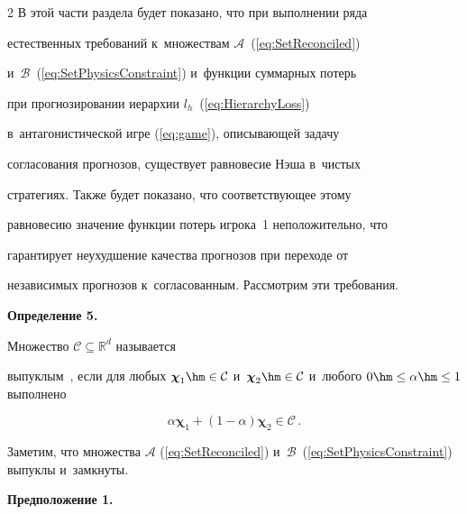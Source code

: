 \begin{multicols}{2}
В этой части раздела будет показано, что при выполнении ряда

естественных требований к~множествам $\mathcal{A}$~(\ref{eq:SetReconciled})

и~$\mathcal{B}$~(\ref{eq:SetPhysicsConstraint}) и~функции суммарных потерь

при прогнозировании иерархии $l_h$~(\ref{eq:HierarchyLoss})

в~антагонистической игре (\ref{eq:game}), описывающей задачу

согласования прогнозов, существует равновесие Нэша в~чис\-тых

стратегиях. Также будет показано, что соответствующее этому

равновесию значение функции потерь игрока~1 неположительно, что

гарантирует неухудшение качества прогнозов при переходе от

независимых прогнозов к~согласованным. Рас\-смот\-рим эти требования.



\smallskip



\noindent

\textbf{Определение 5.}


Множество $\mathcal{C} \subseteq \mathbb{R}^d$ называется

выпуклым~\cite{boyd2009convex}, если для любых $\boldsymbol{\chi}_1 \hm\in

\mathcal{C}$ и~$\boldsymbol{\chi}_2 \hm\in \mathcal{C}$ и~любого $0

\hm\leq \alpha \hm\leq 1$ выполнено

$$

    \alpha \boldsymbol{\chi}_1 + (1 - \alpha) \boldsymbol{\chi}_2 \in \mathcal{C}\,.

$$





\smallskip



Заметим, что множества $\mathcal{A}$ (\ref{eq:SetReconciled}) и~$\mathcal{B}$~(\ref{eq:SetPhysicsConstraint}) выпуклы и~замкнуты.



\smallskip



\noindent

\textbf{Предположение 1.}



\end{multicols}
